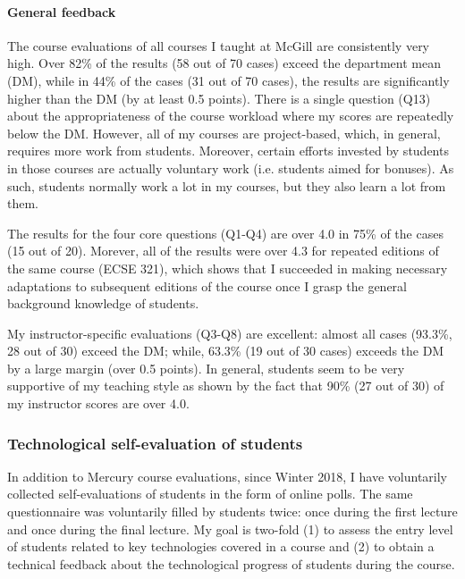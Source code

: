 \documentclass[a4paper,11pt]{article}
\begin{document}
\paragraph{General feedback}

The course evaluations of all courses I taught at McGill are consistently very high. Over 82\% of the results (58 out of 70 cases) exceed the department mean (DM), while in 44\% of the cases (31 out of 70 cases), the results are significantly higher than the DM (by at least 0.5 points). There is a single question (Q13) about the appropriateness of the course workload where my scores are repeatedly below the DM. However, all of my courses are project-based, which, in general, requires more work from students. Moreover, certain efforts invested by students in those courses are actually voluntary work (i.e. students aimed for bonuses). As such, students normally work a lot in my courses, but they also learn a lot from them. 

The results for the four core questions (Q1-Q4) are over 4.0 in 75\% of the cases (15 out of 20). Morever, all of the results were over 4.3 for repeated editions of the same course (ECSE 321), which shows that I succeeded in making necessary adaptations to subsequent editions of the course once I grasp the general background knowledge of students. 

My instructor-specific evaluations (Q3-Q8) are excellent: almost all cases (93.3\%, 28 out of 30) exceed the DM; while, 63.3\% (19 out of 30 cases) exceeds the DM by a large margin (over 0.5 points).  In general, students seem to be very supportive of my teaching style as shown by the fact that 90\% (27 out of 30) of my instructor scores are over 4.0.








\subsubsection{Technological self-evaluation of students}
In addition to Mercury course evaluations, since Winter 2018, I have voluntarily collected self-evaluations of students in the form of online polls. The same questionnaire was voluntarily filled by students twice: once during the first lecture and once during the final lecture. My goal is two-fold (1) to assess the entry level of students related to key technologies covered in a course and (2) to obtain a technical feedback about the technological progress of students during the course. 
\end{document}
